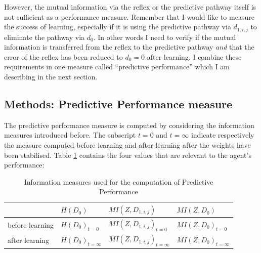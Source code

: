 However, the mutual information via the reflex or the predictive
pathway itself is not sufficient as a performance measure. Remember
that I would like to measure the success of learning, especially if it
is using the predictive
pathway via $d_{1,i,j}$ to eliminate the pathway via $d_0$.
In other words I need to verify if the mutual information is
transferred from the reflex to the predictive pathway \textsl{and}
that the error of the reflex has been reduced to $d_0=0$ after learning. 
I combine these requirements in one measure called 
``predictive performance'' which I am describing in the
next section.


\subsection{Methods: Predictive Performance measure}
The predictive performance measure is computed by considering the
information measures introduced before. The subscript $t=0$ and $t=\infty$ indicate
respectively the measure computed before learning and after learning after the weights 
have been stabilised.
Table \ref{table:PPmeausure:Values} contains the four values that are relevant
to the agent's performance:

\begin{table}[htbp]
\caption[Information values for the \textbf{PP} computation]{Information measures used for the computation of Predictive Performance}
\label{table:PPmeausure:Values}
\begin{center}
  \begin{tabular}{| l | l | l | l |}
    \hline
		    & $H(D_0)$ & $MI(Z,D_{1,i,j})$ & $MI(Z,D_0)$\\ 
    \hline
    before learning & $H(D_0)_{t=0}$ & $MI(Z,D_{1,i,j})_{t=0}$ & $MI(Z,D_0)_{t=0}$ \\ 
    \hline
    after learning &  $H(D_0)_{t=\infty}$& $MI(Z,D_{1,i,j})_{t=\infty}$ & $MI(Z,D_0)_{t=\infty}$ \\ 
    \hline
  \end{tabular}
\end{center}
\end{table}

